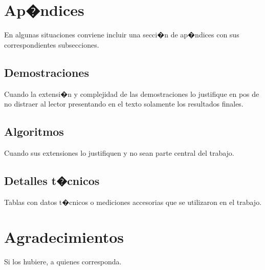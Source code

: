 \documentclass[conference,a4paper,10pt,oneside,final]{tfmpd}
\begin{document}
\section{Ap�ndices}

En algunas situaciones conviene incluir una secci�n de ap�ndices con sus correspondientes subsecciones.

\subsection{Demostraciones}

Cuando la extensi�n y complejidad de las demostraciones lo justifique en pos de no distraer al lector presentando en el texto solamente los resultados finales.

\subsection{Algoritmos}

Cuando sus extensiones lo justifiquen y no sean parte central del trabajo.

\subsection{Detalles t�cnicos}

Tablas con datos t�cnicos o mediciones accesorias que se utilizaron en el trabajo.

\section*{Agradecimientos}

Si los hubiere, a quienes corresponda.

\nocite{*}


\end{document}
